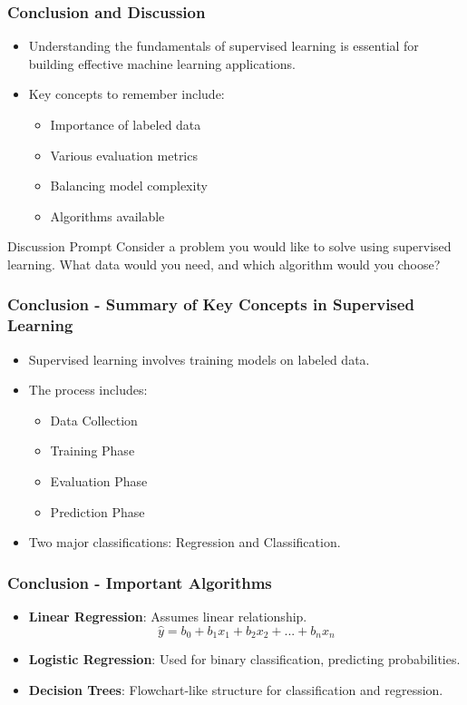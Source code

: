 \documentclass{beamer}
\begin{document}
\begin{frame}[fragile]
    \frametitle{Conclusion and Discussion}
    \begin{itemize}
        \item Understanding the fundamentals of supervised learning is essential for building effective machine learning applications.
        \item Key concepts to remember include:
        \begin{itemize}
            \item Importance of labeled data
            \item Various evaluation metrics
            \item Balancing model complexity
            \item Algorithms available
        \end{itemize}
    \end{itemize}
    \begin{block}{Discussion Prompt}
        Consider a problem you would like to solve using supervised learning. What data would you need, and which algorithm would you choose?
    \end{block}
\end{frame}

\begin{frame}[fragile]
    \frametitle{Conclusion - Summary of Key Concepts in Supervised Learning}
    \begin{itemize}
        \item Supervised learning involves training models on labeled data.
        \item The process includes:
        \begin{itemize}
            \item Data Collection
            \item Training Phase
            \item Evaluation Phase
            \item Prediction Phase
        \end{itemize}
        \item Two major classifications: Regression and Classification.
    \end{itemize}
\end{frame}

\begin{frame}[fragile]
    \frametitle{Conclusion - Important Algorithms}
    \begin{itemize}
        \item \textbf{Linear Regression}: Assumes linear relationship.
        \begin{equation}
            \hat{y} = b_0 + b_1x_1 + b_2x_2 + ... + b_nx_n
        \end{equation}
        \item \textbf{Logistic Regression}: Used for binary classification, predicting probabilities.
        \item \textbf{Decision Trees}: Flowchart-like structure for classification and regression.
    \end{itemize}
\end{frame}
\end{document}
